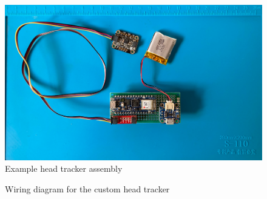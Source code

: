 \begin{figure}[!ht]
\centering
\includegraphics[width=\textwidth]{04_Artefakte/01_Abbildungen/head-tracker-photo}
\caption[Example assembled head tracker]{Example head tracker assembly\protect}
\label{fig:headTrackerAssembled}
\end{figure}

\begin{figure}[!ht]
\centering

\caption[Head tracker wiring diagram]{Wiring diagram for the custom head tracker\protect}
\label{fig:headTrackerWiring}
\end{figure}
